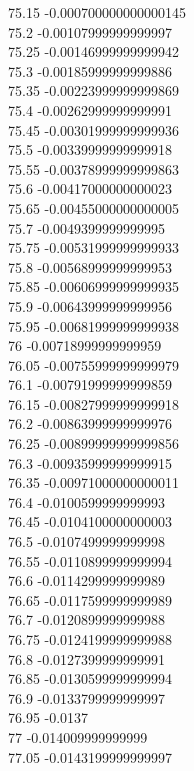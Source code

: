 {75.15	-0.000700000000000145\\
75.2	-0.00107999999999997\\
75.25	-0.00146999999999942\\
75.3	-0.00185999999999886\\
75.35	-0.00223999999999869\\
75.4	-0.00262999999999991\\
75.45	-0.00301999999999936\\
75.5	-0.00339999999999918\\
75.55	-0.00378999999999863\\
75.6	-0.00417000000000023\\
75.65	-0.00455000000000005\\
75.7	-0.0049399999999995\\
75.75	-0.00531999999999933\\
75.8	-0.00568999999999953\\
75.85	-0.00606999999999935\\
75.9	-0.00643999999999956\\
75.95	-0.00681999999999938\\
76	-0.00718999999999959\\
76.05	-0.00755999999999979\\
76.1	-0.00791999999999859\\
76.15	-0.00827999999999918\\
76.2	-0.00863999999999976\\
76.25	-0.00899999999999856\\
76.3	-0.00935999999999915\\
76.35	-0.00971000000000011\\
76.4	-0.0100599999999993\\
76.45	-0.0104100000000003\\
76.5	-0.0107499999999998\\
76.55	-0.0110899999999994\\
76.6	-0.0114299999999989\\
76.65	-0.0117599999999989\\
76.7	-0.0120899999999988\\
76.75	-0.0124199999999988\\
76.8	-0.0127399999999991\\
76.85	-0.0130599999999994\\
76.9	-0.0133799999999997\\
76.95	-0.0137\\
77	-0.014009999999999\\
77.05	-0.0143199999999997\\
}

